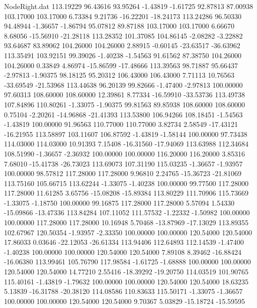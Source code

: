 \begin{filecontents}{NodeRight.dat}
 113.19229   96.43616   93.95264    -1.43819   -1.61725   92.87813   87.00938  103.17000  103.17000    6.73384    9.21736  -16.22201  -18.24173
 113.24286   96.50330   94.48944    -1.36657   -1.86794   95.07812   89.87188  103.17000  103.17000    6.66670    8.68056  -15.56910  -21.28118
 113.28352  101.37085  104.86145    -2.08282   -3.22882   93.64687   83.89062  104.26000  104.26000    2.88915   -0.60145  -23.63517  -36.63962
 113.35491  103.92151   99.39026    -1.40238   -1.54563   91.61562   87.38750  104.26000  104.26000    0.33849    4.86974  -15.86599  -17.48666
 113.39563   98.71887   95.66437    -2.97813   -1.90375   98.18125   95.20312  106.43000  106.43000    7.71113   10.76563  -33.69549  -21.53968
 113.44638   96.20139   99.82666    -1.47400   -2.97813  100.00000   97.60313  108.60000  108.60000   12.39861    8.77334  -16.59910  -33.53736
 113.49738  107.84896  110.80261    -1.33075   -1.90375   99.81563   89.85938  108.60000  108.60000    0.75104   -2.20261  -14.96868  -21.41393
 113.53800  106.94266  108.18451    -1.54563   -1.43819  100.00000   91.96563  110.77000  110.77000    3.82734    2.58549  -17.43121  -16.21955
 113.58897  103.11607  106.87592    -1.43819   -1.58144  100.00000   97.73438  114.03000  114.03000   10.91393    7.15408  -16.31560  -17.94069
 113.63988  112.34684  108.51990    -1.36657   -2.36932  100.00000  100.00000  116.20000  116.20000    3.85316    7.68010  -15.41738  -26.73023
 113.69073  107.31190  115.03235    -1.36657   -1.93957  100.00000   98.57812  117.28000  117.28000    9.96810    2.24765  -15.36723  -21.81069
 113.75160  105.66715  113.62244    -1.33075   -1.40238  100.00000   99.77500  117.28000  117.28000   11.61285    3.65756  -15.08208  -15.89384
 113.80229  111.70906  115.73669    -1.33075   -1.18750  100.00000   99.16875  117.28000  117.28000    5.57094    1.54330  -15.09866  -13.47336
 113.84284  107.11052  111.57532    -1.22332   -1.50982  100.00000  100.00000  117.28000  117.28000   10.16948    5.70468  -13.87969  -17.13029
 113.89355  102.67967  120.50354    -1.93957   -2.33350  100.00000  100.00000  120.54000  120.54000   17.86033    0.03646  -22.12053  -26.61334
 113.94406  112.64893  112.14539    -1.47400   -1.40238  100.00000  100.00000  120.54000  120.54000    7.89108    8.39462  -16.88424  -16.06380
 113.99461  105.76790  117.98584    -1.61725   -1.68888  100.00000  100.00000  120.54000  120.54000   14.77210    2.55416  -18.39292  -19.20750
 114.03519  101.90765  115.40161    -1.43819   -1.79632  100.00000  100.00000  120.54000  120.54000   18.63235    5.13839  -16.31788  -20.38120
 114.08586  110.83633  115.50171    -1.33075   -1.36657  100.00000  100.00000  120.54000  120.54000    9.70367    5.03829  -15.18724  -15.59595

\end{filecontents}
